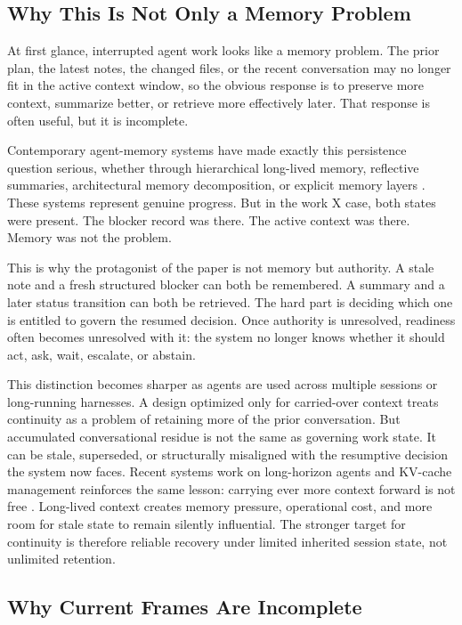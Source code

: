 \documentclass[a4paper,fleqn]{cas-sc}
\begin{document}
\subsection{Why This Is Not Only a Memory Problem}

At first glance, interrupted agent work looks like a memory problem. The prior plan, the latest notes, the changed files, or the recent conversation may no longer fit in the active context window, so the obvious response is to preserve more context, summarize better, or retrieve more effectively later. That response is often useful, but it is incomplete.

Contemporary agent-memory systems have made exactly this persistence question serious, whether through hierarchical long-lived memory, reflective summaries, architectural memory decomposition, or explicit memory layers \cite{Packer2023,Shinn2023,Sumers2023,ZhangMemory2024,Chhikara2025}. These systems represent genuine progress. But in the work X case, both states were present. The blocker record was there. The active context was there. Memory was not the problem.

This is why the protagonist of the paper is not memory but authority. A stale note and a fresh structured blocker can both be remembered. A summary and a later status transition can both be retrieved. The hard part is deciding which one is entitled to govern the resumed decision. Once authority is unresolved, readiness often becomes unresolved with it: the system no longer knows whether it should act, ask, wait, escalate, or abstain.

This distinction becomes sharper as agents are used across multiple sessions or long-running harnesses. A design optimized only for carried-over context treats continuity as a problem of retaining more of the prior conversation. But accumulated conversational residue is not the same as governing work state. It can be stale, superseded, or structurally misaligned with the resumptive decision the system now faces. Recent systems work on long-horizon agents and KV-cache management reinforces the same lesson: carrying ever more context forward is not free \cite{Wang2026,Wu2026}. Long-lived context creates memory pressure, operational cost, and more room for stale state to remain silently influential. The stronger target for continuity is therefore reliable recovery under limited inherited session state, not unlimited retention.

\subsection{Why Current Frames Are Incomplete}
\end{document}
